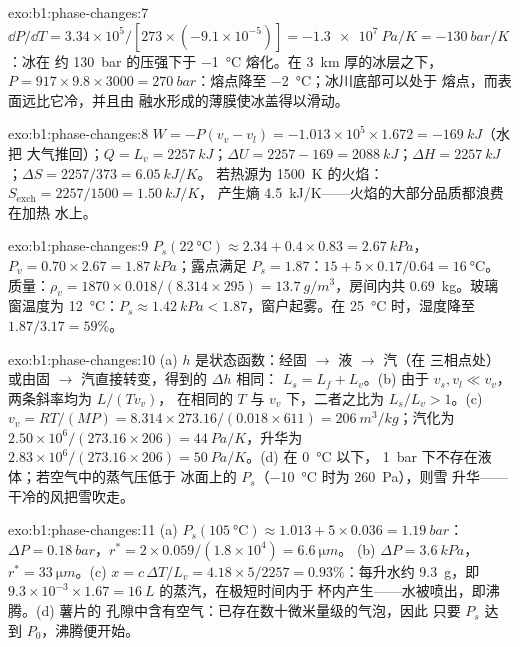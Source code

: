 \begin{solution}{exo:b1:phase-changes:7}
$\dd P/\dd T = 3.34 \times 10^5/[273 \times (-9.1 \times 10^{-5})] = \qty{-1.3e7}{Pa/K}
= \qty{-130}{bar/K}$：冰在
约 \qty{130}{bar} 的压强下于 \qty{-1}{\degreeCelsius} 熔化。在 \qty{3}{km} 厚的冰层之下，$P = 917 \times 9.8 \times 3000 =
\qty{270}{bar}$：熔点降至 \qty{-2}{\degreeCelsius}；冰川底部可以处于
熔点，而表面远比它冷，并且由
融水形成的薄膜使冰盖得以滑动。
\end{solution}

\begin{solution}{exo:b1:phase-changes:8}
$W = -P(v_v - v_l) = -1.013 \times 10^5 \times 1.672 = \qty{-169}{kJ}$（水把
大气推回）；$Q = L_v = \qty{2257}{kJ}$；$\Delta U = 2257 - 169
= \qty{2088}{kJ}$；$\Delta H = \qty{2257}{kJ}$；$\Delta S = 2257/373 = \qty{6.05}{kJ/K}$。
若热源为 \qty{1500}{K} 的火焰：$S_{\mathrm{exch}} = 2257/1500 = \qty{1.50}{kJ/K}$，
产生熵 \qty{4.5}{kJ/K}——火焰的大部分品质都浪费在加热
水上。
\end{solution}

\begin{solution}{exo:b1:phase-changes:9}
$P_s(\qty{22}{\degreeCelsius}) \approx 2.34 + 0.4 \times 0.83 = \qty{2.67}{kPa}$，
$P_v = 0.70 \times 2.67 = \qty{1.87}{kPa}$；露点满足 $P_s = 1.87$：$15 +
5 \times 0.17/0.64 = \qty{16}{\degreeCelsius}$。质量：$\rho_v = 1870 \times 0.018/
(8.314 \times 295) = \qty{13.7}{g/m^3}$，房间内共 \qty{0.69}{kg}。玻璃窗温度为
\qty{12}{\degreeCelsius}：$P_s \approx \qty{1.42}{kPa} < 1.87$，窗户起雾。在
\qty{25}{\degreeCelsius} 时，湿度降至 $1.87/3.17 = 59\%$。
\end{solution}

\begin{solution}{exo:b1:phase-changes:10}
(a) $h$ 是状态函数：经固 $\to$ 液 $\to$ 汽（在
三相点处）或由固 $\to$ 汽直接转变，得到的 $\Delta h$ 相同：
$L_s = L_f + L_v$。(b) 由于 $v_s, v_l \ll v_v$，两条斜率均为 $L/(Tv_v)$，
在相同的 $T$ 与 $v_v$ 下，二者之比为 $L_s/L_v > 1$。(c) $v_v = RT/(MP) =
8.314 \times 273.16/(0.018 \times 611) = \qty{206}{m^3/kg}$；汽化为
$2.50 \times 10^6/(273.16 \times 206) = \qty{44}{Pa/K}$，升华为 $2.83 \times 10^6/
(273.16 \times 206) = \qty{50}{Pa/K}$。(d) 在 \qty{0}{\degreeCelsius} 以下，
\qty{1}{bar} 下不存在液体；若空气中的蒸气压低于
冰面上的 $P_s$（\qty{-10}{\degreeCelsius} 时为 \qty{260}{Pa}），则雪
升华——干冷的风把雪吹走。
\end{solution}

\begin{solution}{exo:b1:phase-changes:11}
(a) $P_s(\qty{105}{\degreeCelsius}) \approx 1.013 + 5 \times 0.036 = \qty{1.19}{bar}$：
$\Delta P = \qty{0.18}{bar}$，$r^\ast = 2 \times 0.059/(1.8 \times 10^4) = \qty{6.6}{\micro m}$。
(b) $\Delta P = \qty{3.6}{kPa}$，$r^\ast = \qty{33}{\micro m}$。(c) $x = c\,\Delta T/L_v =
4.18 \times 5/2257 = 0.93\%$：每升水约 \qty{9.3}{g}，即 $9.3 \times 10^{-3}
\times 1.67 = \qty{16}{L}$ 的蒸汽，在极短时间内于
杯内产生——水被喷出，即沸腾。(d) 薯片的
孔隙中含有空气：已存在数十微米量级的气泡，因此
只要 $P_s$ 达到 $P_0$，沸腾便开始。
\end{solution}

